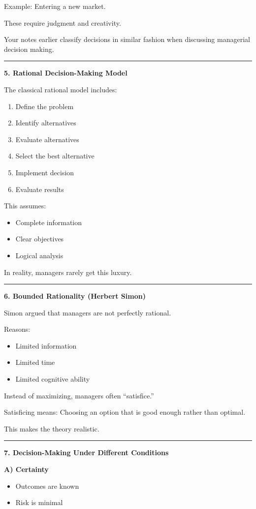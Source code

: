 \documentclass[10pt,a4paper]{article}
\newcommand{\separator}{\vspace{0.4em}\noindent\rule{\linewidth}{0.6pt}\vspace{0.4em}}
\begin{document}
Example: Entering a new market.

These require judgment and creativity.

Your notes earlier classify decisions in similar fashion when discussing managerial decision
making.

\separator

\textbf{5. Rational Decision-Making Model}

The classical rational model includes:

\begin{enumerate}
  \item Define the problem
  \item Identify alternatives
  \item Evaluate alternatives
  \item Select the best alternative
  \item Implement decision
  \item Evaluate results
\end{enumerate}

This assumes:
\begin{itemize}
  \item Complete information
  \item Clear objectives
  \item Logical analysis
\end{itemize}

In reality, managers rarely get this luxury.

\separator

\textbf{6. Bounded Rationality (Herbert Simon)}

Simon argued that managers are not perfectly rational.

Reasons:
\begin{itemize}
  \item Limited information
  \item Limited time
  \item Limited cognitive ability
\end{itemize}

Instead of maximizing, managers often ``satisfice.''

Satisficing means: Choosing an option that is good enough rather than optimal.

This makes the theory realistic.

\separator

\textbf{7. Decision-Making Under Different Conditions}

\textbf{A) Certainty}
\begin{itemize}
  \item Outcomes are known
  \item Risk is minimal
\end{itemize}
\end{document}
